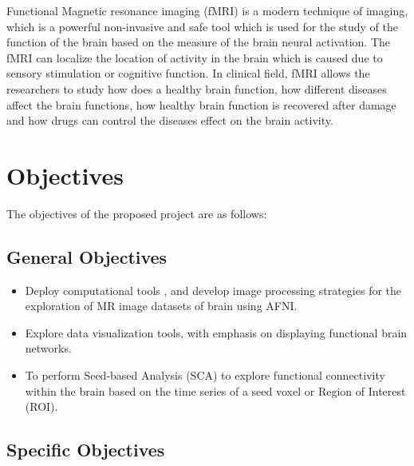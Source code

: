 \documentclass{article}
\begin{document}
\enlargethispage{\baselineskip}

Functional Magnetic resonance imaging (fMRI) is a modern technique of
imaging, which is a powerful non-invasive and safe tool which is used
for the study of the function of the brain based on the measure of the
brain neural activation. The fMRI can localize the location of
activity in the  brain  which  is  caused  due  to sensory stimulation
or  cognitive  function. In clinical field, fMRI allows the
researchers to study how does a healthy brain function, how different
diseases affect the brain functions, how healthy brain function is
recovered after damage and how drugs can control the diseases effect
on the brain activity.


\newpage

\section{Objectives}

The objectives of the proposed project are as follows:

\subsection{General Objectives}

\begin{itemize}

  \item Deploy computational tools , and develop image processing
    strategies for the exploration of MR image datasets of brain using
    AFNI.

  \item Explore data visualization tools, with emphasis on displaying
    functional brain networks.

  \item To perform Seed-based Analysis (SCA) to explore functional
    connectivity within the brain based on the time series of a seed
    voxel or Region of Interest (ROI).

\end{itemize}

\subsection{Specific Objectives}
\end{document}
